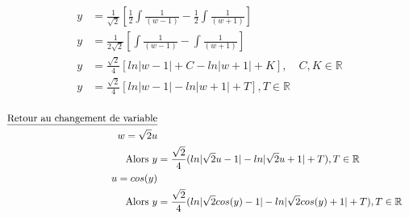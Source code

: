 \begin{align*}
	y &= \frac{1}{\sqrt{2}}[\frac{1}{2}\int\frac{1}{(w-1)} - \frac{1}{2}\int\frac{1}{(w+1)}] \\
	y &= \frac{1}{2\sqrt{2}}[\int\frac{1}{(w-1)} - \int\frac{1}{(w+1)}] \\
	y &= \frac{\sqrt{2}}{4}[ln|w-1| + C - ln|w+1| + K], \quad C, K \in \mathbb{R} \\
	y &= \frac{\sqrt{2}}{4}[ln|w-1| - ln|w+1| + T], T \in \mathbb{R} \\
\end{align*}

\begin{align*}
	\text{\underline{Retour au changement de variable}} \\
	w = \sqrt{2}u \\
	\text{Alors } y &= \frac{\sqrt{2}}{4}(ln|\sqrt{2}u-1| - ln|\sqrt{2}u+1| + T), T \in \mathbb{R} \\
	u = cos(y) \\
	\text{Alors } y &= \frac{\sqrt{2}}{4}(ln|\sqrt{2}cos(y)-1| - ln|\sqrt{2}cos(y)+1| + T), T \in \mathbb{R}
\end{align*}
